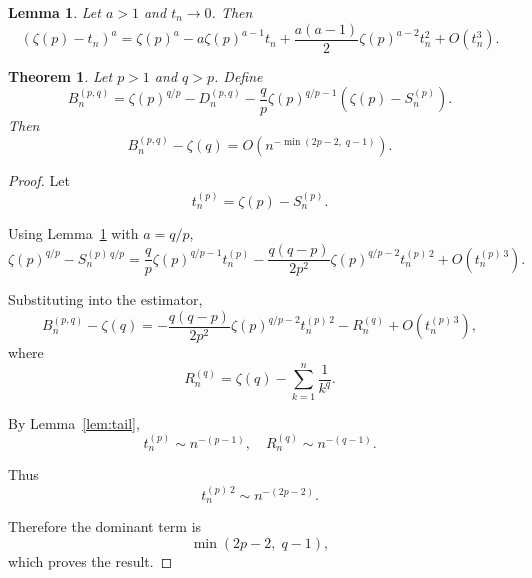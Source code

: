 \documentclass[10pt,a4paper]{amsart}
\newtheorem{lemma}{Lemma}
\newtheorem{theorem}{Theorem}
\begin{document}
\begin{lemma}
\label{lem:taylor}
Let $a>1$ and $t_n \to 0$. Then
\[
(\zeta(p) - t_n)^a
=
\zeta(p)^a
- a\zeta(p)^{a-1} t_n
+ \frac{a(a-1)}{2}\zeta(p)^{a-2} t_n^2
+ O(t_n^3).
\]
\end{lemma}

\begin{theorem}
\label{thm:general}
Let $p>1$ and $q>p$. Define
\[
B_n^{(p,q)}
=
\zeta(p)^{q/p}
-
D_n^{(p,q)}
-
\frac{q}{p}\zeta(p)^{q/p-1}(\zeta(p)-S_n^{(p)}).
\]
Then
\[
B_n^{(p,q)} - \zeta(q)
=
O\!\left(n^{-\min(2p-2,\;q-1)}\right).
\]
\end{theorem}

\begin{proof}
Let
\[
t_n^{(p)} = \zeta(p) - S_n^{(p)}.
\]

Using Lemma~\ref{lem:taylor} with $a=q/p$,
\[
\zeta(p)^{q/p} - S_n^{(p)\,q/p}
=
\frac{q}{p}\zeta(p)^{q/p-1} t_n^{(p)}
-
\frac{q(q-p)}{2p^2}\zeta(p)^{q/p-2} t_n^{(p)\,2}
+ O(t_n^{(p)\,3}).
\]

Substituting into the estimator,
\[
B_n^{(p,q)} - \zeta(q)
=
-\frac{q(q-p)}{2p^2}\zeta(p)^{q/p-2} t_n^{(p)\,2}
- R_n^{(q)} + O(t_n^{(p)\,3}),
\]
where
\[
R_n^{(q)} = \zeta(q) - \sum_{k=1}^n \frac{1}{k^q}.
\]

By Lemma~\ref{lem:tail},
\[
t_n^{(p)} \sim n^{-(p-1)}, \quad
R_n^{(q)} \sim n^{-(q-1)}.
\]

Thus
\[
t_n^{(p)\,2} \sim n^{-(2p-2)}.
\]

Therefore the dominant term is
\[
\min(2p-2,\;q-1),
\]
which proves the result.
\end{proof}
\end{document}
